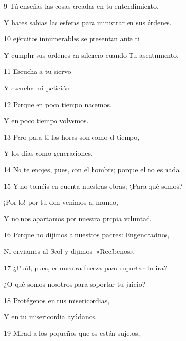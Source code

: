 \par 9 Tú enseñas las cosas creadas en tu entendimiento,

\par Y haces sabias las esferas para ministrar en sus órdenes.

\par 10 ejércitos innumerables se presentan ante ti

\par Y cumplir sus órdenes en silencio cuando Tu asentimiento.

\par 11 Escucha a tu siervo

\par Y escucha mi petición.

\par 12 Porque en poco tiempo nacemos,

\par Y en poco tiempo volvemos.

\par 13 Pero para ti las horas son como el tiempo,

\par Y los días como generaciones.

\par 14 No te enojes, pues, con el hombre; porque el no es nada

\par 15 Y no toméis en cuenta nuestras obras; ¿Para qué somos?

\par ¡Por lo! por tu don venimos al mundo,

\par Y no nos apartamos por nuestra propia voluntad.

\par 16 Porque no dijimos a nuestros padres: Engendradnos,

Ni enviamos al Seol y dijimos: «Recíbenos».

\par 17 ¿Cuál, pues, es nuestra fuerza para soportar tu ira?

¿O qué somos nosotros para soportar tu juicio?

\par 18 Protégenos en tus misericordias,

\par Y en tu misericordia ayúdanos.

\par 19 Mirad a los pequeños que os están sujetos,

